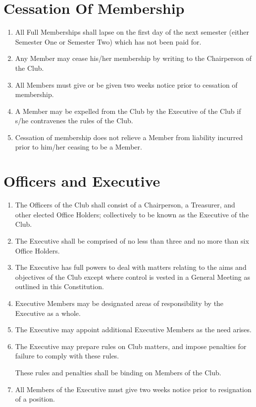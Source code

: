 \documentclass[a4paper]{article}
\begin{document}
	\section{Cessation Of Membership}
	
	\begin{enumerate}
		\item All Full Memberships shall lapse on the first day of the next semester (either Semester One or Semester Two) which has not been paid for.
		
		\item \label{cease-by-writing} Any Member may cease his/her membership by writing to the Chairperson of the Club.
		
		\item All Members must give or be given two weeks notice prior to cessation of membership.
		
		\item \label{cease-by-expulsion} A Member may be expelled from the Club by the Executive of the Club if s/he contravenes the rules of the Club.
		
		\item Cessation of membership does not relieve a Member from liability incurred prior to him/her ceasing to be a Member.
	\end{enumerate}

	\section{Officers and Executive}
	
	\begin{enumerate}
		\item The Officers of the Club shall consist of a Chairperson, a Treasurer, and other elected Office Holders; collectively to be known as the Executive of the Club.
		
		\item The Executive shall be comprised of no less than three and no more than six Office Holders.
		
		\item The Executive has full powers to deal with matters relating to the aims and objectives of the Club except where control is vested in a General Meeting as outlined in this Constitution.
		
		\item Executive Members may be designated areas of responsibility by the Executive as a whole.
		
		\item The Executive may appoint additional Executive Members as the need arises.
		
		\item The Executive may prepare rules on Club matters, and impose penalties for failure to comply with these rules.
		
		These rules and penalties shall be binding on Members of the Club.
		\item All Members of the Executive must give two weeks notice prior to resignation of a position.
	\end{enumerate}
	
\end{document}
